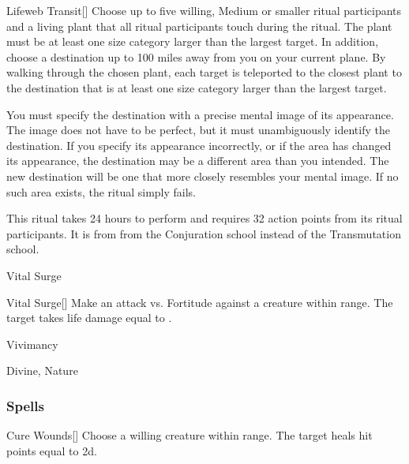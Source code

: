 \begin{ability}[\nth{4}]{Lifeweb Transit}[]
Choose up to five willing, Medium or smaller ritual participants and a living plant that all ritual participants touch during the ritual.
The plant must be at least one size category larger than the largest target.
In addition, choose a destination up to 100 miles away from you on your current plane.
By walking through the chosen plant, each target is teleported to the closest plant to the destination that is at least one size category larger than the largest target.

You must specify the destination with a precise mental image of its appearance.
The image does not have to be perfect, but it must unambiguously identify the destination.
If you specify its appearance incorrectly, or if the area has changed its appearance, the destination may be a different area than you intended.
The new destination will be one that more closely resembles your mental image.
If no such area exists, the ritual simply fails.

This ritual takes 24 hours to perform and requires 32 action points from its ritual participants.
It is from from the Conjuration school instead of the Transmutation school.
\end{ability}
\vspace{0.25em}


\newpage
\begin{spellsection}{Vital Surge}


\begin{ability}{Vital Surge}[]
Make an attack vs. Fortitude against a creature within \rngmed range.
\hit The target takes life damage equal to .
\end{ability}




 Vivimancy

 Divine, Nature
\end{spellsection}


\subsubsection{Spells}


\begin{ability}[\nth{1}]{Cure Wounds}[]
Choose a willing creature within \rngmed range.
The target heals hit points equal to  \plus2d.
\end{ability}
\vspace{0.25em}



